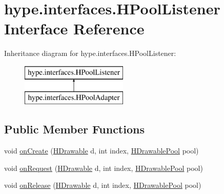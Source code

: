 \hypertarget{interfacehype_1_1interfaces_1_1_h_pool_listener}{\section{hype.\-interfaces.\-H\-Pool\-Listener Interface Reference}
\label{interfacehype_1_1interfaces_1_1_h_pool_listener}
}
Inheritance diagram for hype.\-interfaces.\-H\-Pool\-Listener\-:\begin{figure}[H]
\begin{center}
\leavevmode
\includegraphics[height=2.000000cm]{interfacehype_1_1interfaces_1_1_h_pool_listener}
\end{center}
\end{figure}
\subsection*{Public Member Functions}
\begin{DoxyCompactItemize}
\item 
void \hyperlink{interfacehype_1_1interfaces_1_1_h_pool_listener_a64d77ade69a6c7be924af66f81f7d307}{on\-Create} (\hyperlink{classhype_1_1drawable_1_1_h_drawable}{H\-Drawable} d, int index, \hyperlink{classhype_1_1util_1_1_h_drawable_pool}{H\-Drawable\-Pool} pool)
\item 
void \hyperlink{interfacehype_1_1interfaces_1_1_h_pool_listener_a76401bacc56a1240b5eecf910dacf444}{on\-Request} (\hyperlink{classhype_1_1drawable_1_1_h_drawable}{H\-Drawable} d, int index, \hyperlink{classhype_1_1util_1_1_h_drawable_pool}{H\-Drawable\-Pool} pool)
\item 
void \hyperlink{interfacehype_1_1interfaces_1_1_h_pool_listener_a20d5373cb940f031d629fe8419e55348}{on\-Release} (\hyperlink{classhype_1_1drawable_1_1_h_drawable}{H\-Drawable} d, int index, \hyperlink{classhype_1_1util_1_1_h_drawable_pool}{H\-Drawable\-Pool} pool)
\end{DoxyCompactItemize}


